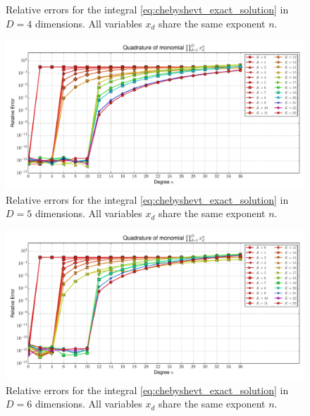 \documentclass[a4paper,10pt]{article}
\begin{document}
\begin{subfigures}
\begin{figure}
    \caption{Relative errors for the integral \eqref{eq:chebyshevt_exact_solution}
    in $D=4$ dimensions. All variables $x_d$ share the same exponent $n$.}
    \label{fig:monomial_errors_chebyshevt_multivariate_dimension_4}
  \end{figure}
  \begin{figure}\centering
    \includegraphics[width=\linewidth]{./img/monomial_errors_chebyshevt_multivariate_dimension_5.pdf}
    \caption{Relative errors for the integral \eqref{eq:chebyshevt_exact_solution}
    in $D=5$ dimensions. All variables $x_d$ share the same exponent $n$.}
    \label{fig:monomial_errors_chebyshevt_multivariate_dimension_5}
  \end{figure}
  \begin{figure}\centering
    \includegraphics[width=\linewidth]{./img/monomial_errors_chebyshevt_multivariate_dimension_6.pdf}
    \caption{Relative errors for the integral \eqref{eq:chebyshevt_exact_solution}
    in $D=6$ dimensions. All variables $x_d$ share the same exponent $n$.}
    \label{fig:monomial_errors_chebyshevt_multivariate_dimension_6}
  \end{figure}
  \label{fig:monomial_errors_chebyshevt_multivariate}
\end{subfigures}
\end{document}
